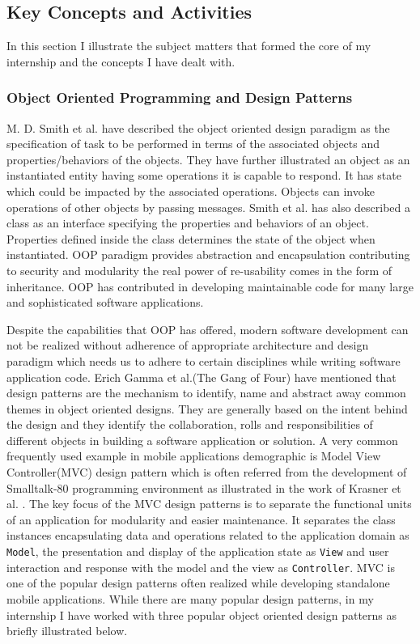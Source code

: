 \subsection{Key Concepts and Activities}
In this section I illustrate the subject  matters that formed the core of my internship and the concepts I have dealt with.

\subsubsection{Object Oriented Programming and Design Patterns}
M. D. Smith et al. \cite{smith2011object} have described the object oriented design paradigm as the specification of task to be performed in terms of the associated objects and properties/behaviors of the objects. They have further illustrated an object as an instantiated entity having some operations it is capable to respond. It has state which could be impacted by the associated operations. Objects can invoke operations of other objects by passing messages. Smith et al. \cite{smith2011object} has also described a class as an interface specifying the properties and behaviors of an object. Properties defined inside the class determines the state of the object when instantiated. OOP paradigm provides abstraction and encapsulation contributing to security and modularity the real power of re-usability comes in the form of inheritance. OOP has contributed in developing maintainable code for many large and sophisticated software applications. 
\par Despite the capabilities that OOP has offered, modern software development can not be realized without adherence of appropriate architecture and design paradigm which needs us to adhere to certain disciplines while writing software application code. Erich Gamma et al.(The Gang of Four) \cite{gamma1995design}  have mentioned that design patterns are the mechanism to identify, name and abstract away common themes in object oriented designs. They are generally based on the intent behind the design and they identify the collaboration, rolls and responsibilities of different objects in building a software application or solution. A very common frequently used example in mobile applications demographic is Model View Controller(MVC) design pattern which is often referred from the development of  Smalltalk-80 programming environment as illustrated in the work of Krasner et al. \cite{krasner1988description}. The key focus of the MVC design patterns is to separate the functional units of an application for modularity and easier maintenance. It separates the class instances encapsulating data and operations related to the application domain as \texttt{Model}, the presentation and display of the application state as \texttt{View} and user interaction and response with the model and the view as \texttt{Controller}. MVC is one of the popular design patterns often realized while developing standalone mobile applications. While there are many popular design patterns, in my internship I have worked with three popular object oriented design patterns as briefly illustrated below.
